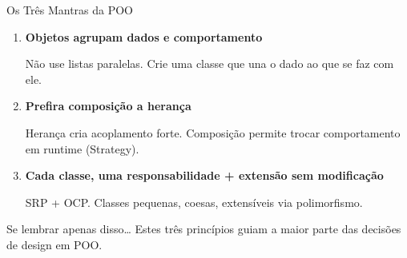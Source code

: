 \documentclass[aspectratio=169]{beamer}
\begin{document}
\begin{frame}{Os Três Mantras da POO}
\begin{enumerate}
  \item \textbf{Objetos agrupam dados e comportamento}

  Não use listas paralelas. Crie uma classe que una o dado ao que se faz com ele.

  \item \textbf{Prefira composição a herança}

  Herança cria acoplamento forte. Composição permite trocar comportamento em runtime (Strategy).

  \item \textbf{Cada classe, uma responsabilidade + extensão sem modificação}

  SRP + OCP. Classes pequenas, coesas, extensíveis via polimorfismo.
\end{enumerate}

\begin{exampleblock}{Se lembrar apenas disso\ldots}
Estes três princípios guiam a maior parte das decisões de design em POO.
\end{exampleblock}
\end{frame}
\end{document}
